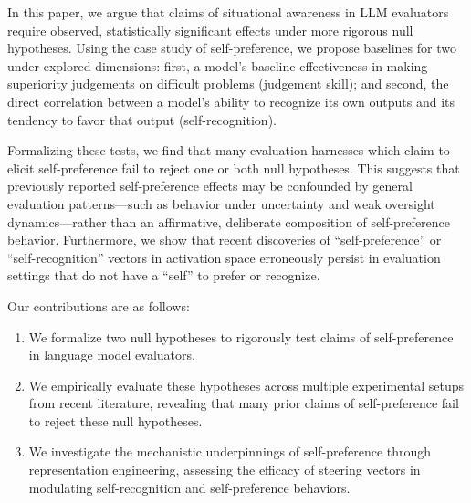 \documentclass{article}
\theoremstyle{plain}
\theoremstyle{definition}
\theoremstyle{remark}
\begin{document}
In this paper, we argue that claims of situational awareness in LLM evaluators require observed, statistically significant effects under more rigorous null hypotheses. Using the case study of self-preference, we propose baselines for two under-explored dimensions: first, a model’s baseline effectiveness in making superiority judgements on difficult problems (judgement skill); and second, the direct correlation between a model’s ability to recognize its own outputs and its tendency to favor that output (self-recognition).

% 
Formalizing these tests, we find that many evaluation harnesses which claim to elicit self-preference fail to reject one or both null hypotheses. This suggests that previously reported self-preference effects may be confounded by general evaluation patterns---such as behavior under uncertainty and weak oversight dynamics---rather than an affirmative, deliberate composition of self-preference behavior. Furthermore, we show that recent discoveries of ``self-preference'' \cite{roytburgBreakingMirrorActivationBased2025} or ``self-recognition'' \cite{ackermanInspectionControlSelfGeneratedText2024} vectors in activation space erroneously persist in evaluation settings that do not have a ``self'' to prefer or recognize.

Our contributions are as follows:
\begin{enumerate}
  \item We formalize two null hypotheses to rigorously test claims of self-preference in language model evaluators.
  \item We empirically evaluate these hypotheses across multiple experimental setups from recent literature, revealing that many prior claims of self-preference fail to reject these null hypotheses.
  \item We investigate the mechanistic underpinnings of self-preference through representation engineering, assessing the efficacy of steering vectors in modulating self-recognition and self-preference behaviors.
\end{enumerate}
\end{document}
